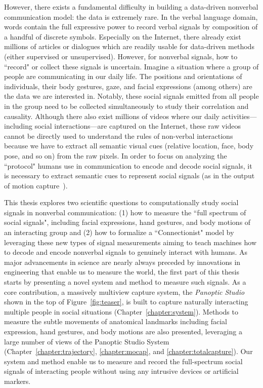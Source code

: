 However, there exists a fundamental difficulty in building a data-driven nonverbal communication model: the data is extremely rare. In the verbal language domain, words contain the full expressive power to record verbal signals by composition of a handful of discrete symbols. Especially on the Internet, there already exist millions of articles or dialogues which are readily usable for data-driven methods (either supervised or unsupervised). However, for nonverbal signals, how to ``record" or collect these signals is uncertain. Imagine a situation where a group of people are communicating in our daily life. The positions and orientations of individuals, their body gestures, gaze, and facial expressions (among others) are the data we are interested in. Notably, these social signals emitted from all people in the group need to be collected simultaneously to study their correlation and causality. Although there also exist millions of videos where our daily activities---including social interactions---are captured on the Internet, these raw videos cannot be directly used to understand the rules of non-verbal interactions because we have to extract all semantic visual cues (relative location, face, body pose, and so on) from the raw pixels. In order to focus on analyzing the ``protocol" humans use in communication to encode and decode social signals, it is necessary to extract semantic cues to represent social signals (as in the output of motion capture~\cite{VICON}).  %

This thesis explores two scientific questions to computationally study social signals in nonverbal communication: (1) how to measure the ``full spectrum of social signals", including facial expressions, hand gestures, and body motions of an interacting group and (2) how to formalize a ``Connectionist" model by leveraging these new types of signal measurements aiming to teach machines how to decode and encode nonverbal signals to genuinely interact with humans. As major advancements in science are nearly always preceded by innovations in engineering that enable us to measure the world, the first part of this thesis starts by presenting a novel system and method to measure such signals. As a core contribution, a massively multiview capture system, the \emph{Panoptic Studio} shown in the top of Figure~\ref{fig:teaser}, is built to capture naturally interacting multiple people in social situations (Chapter~\ref{chapter:system}). Methods to measure the subtle movements of anatomical landmarks including facial expression, hand gestures, and body motions are also presented, leveraging a large number of views of the Panoptic Studio System (Chapter~\ref{chapter:trajectory}, \ref{chapter:mocap}, and  \ref{chapter:totalcapture}). Our system and method enable us to measure and record the full-spectrum social signals of interacting people without using any intrusive devices or artificial markers. 


